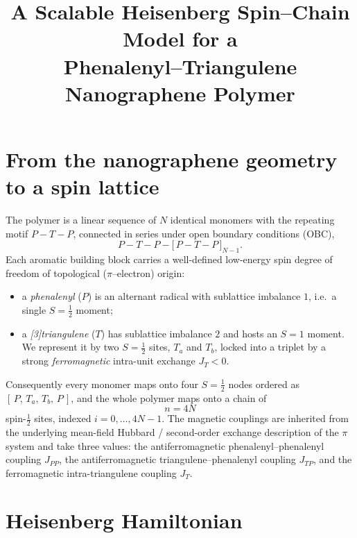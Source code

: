 \documentclass[11pt]{article}
\title{A Scalable Heisenberg Spin--Chain Model for a\\
Phenalenyl--Triangulene Nanographene Polymer}
\author{}
\date{}
\begin{document}
\maketitle

\section{From the nanographene geometry to a spin lattice}

The polymer is a linear sequence of $N$ identical monomers with the
repeating motif $P\!-\!T\!-\!P$, connected in series under open boundary
conditions (OBC),
\begin{equation*}
  P\!-\!T\!-\!P-\big[\,P\!-\!T\!-\!P\,\big]_{N-1}.
\end{equation*}
Each aromatic building block carries a well-defined low-energy spin degree
of freedom of topological ($\pi$--electron) origin:
\begin{itemize}
  \item a \emph{phenalenyl} ($P$) is an alternant radical with sublattice
        imbalance $1$, i.e.\ a single $S=\tfrac12$ moment;
  \item a \emph{[3]triangulene} ($T$) has sublattice imbalance $2$ and hosts
        an $S=1$ moment. We represent it by two $S=\tfrac12$ sites,
        $T_a$ and $T_b$, locked into a triplet by a strong
        \emph{ferromagnetic} intra-unit exchange $J_{T}<0$.
\end{itemize}
Consequently every monomer maps onto four $S=\tfrac12$ nodes ordered as
$[\,P,\,T_a,\,T_b,\,P\,]$, and the whole polymer maps onto a chain of
\begin{equation}
  n = 4N
\end{equation}
spin-$\tfrac12$ sites, indexed $i=0,\dots,4N-1$. The magnetic couplings are
inherited from the underlying mean-field Hubbard / second-order exchange
description of the $\pi$ system and take three values: the antiferromagnetic
phenalenyl--phenalenyl coupling $J_{PP}$, the antiferromagnetic
triangulene--phenalenyl coupling $J_{TP}$, and the ferromagnetic
intra-triangulene coupling $J_{T}$.

\section{Heisenberg Hamiltonian}
\end{document}
